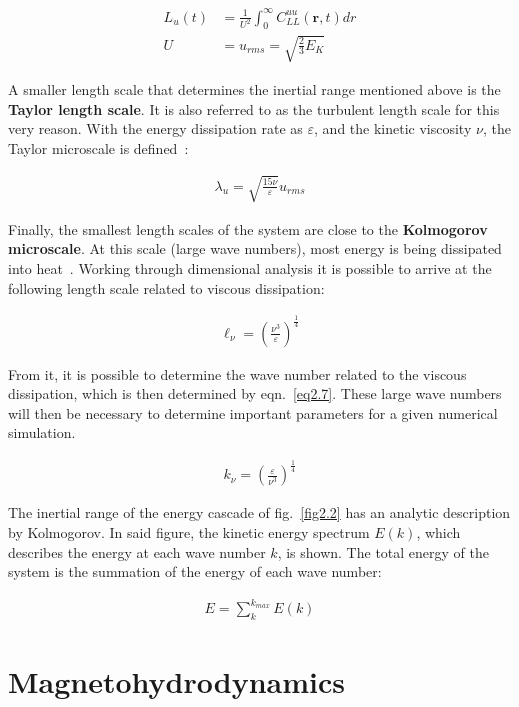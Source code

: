 \documentclass[12pt,a4paper]{report}
\begin{document}
\begin{align}
 L_u(t) &= \frac{1}{U^2} \int_0^\infty C_{LL}^{uu}(\bm r, t) dr \nonumber \\
 U&=u_{rms}=\sqrt{\frac{2}{3}E_K} \nonumber
\end{align}

A smaller length scale that determines the inertial range mentioned above is the \textbf{Taylor length scale}. It is also referred to as the turbulent length scale for this very reason. With the energy dissipation rate as $\varepsilon$, and the kinetic viscosity $\nu$, the Taylor microscale is defined~\cite{LinkmannMoritzFrederikLeon2016Spim}:

\begin{align}
 \lambda_u = \sqrt{\frac{15 \nu}{\varepsilon}} u_{rms} \nonumber
\end{align}

Finally, the smallest length scales of the system are close to the \textbf{Kolmogorov microscale}. At this scale (large wave numbers), most energy is being dissipated into heat~\cite{mccomb1990physics}. Working through dimensional analysis it is possible to arrive at the following length scale related to viscous dissipation:

\begin{align}
 \ell_\nu = \left( \frac{\nu^3}{\varepsilon} \right)^{\frac{1}{4}} \nonumber
\end{align}

From it, it is possible to determine the wave number related to the viscous dissipation, which is then determined by eqn.~\ref{eq2.7}. These large wave numbers will then be necessary to determine important parameters for a given numerical simulation. 

\begin{align}
 k_\nu = \left( \frac{\varepsilon}{\nu^3} \right)^{\frac{1}{4}} \label{eq2.7}
\end{align}

The inertial range of the energy cascade of fig.~\ref{fig2.2} has an analytic description by Kolmogorov. In said figure, the kinetic energy spectrum $E(k)$, which describes the energy at each wave number $k$, is shown. The total energy of the system is the summation of the energy of each wave number:

\begin{align}
 E = \sum_k^{k_{max}} E(k)
\end{align}


\chapter{Magnetohydrodynamics}
\end{document}
